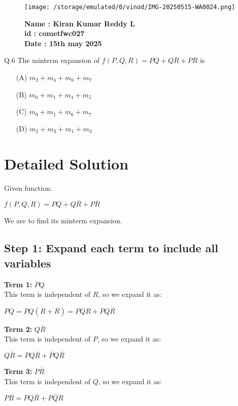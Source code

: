 \documentclass{article}
\begin{document}
\begin{figure}[h!]
    \begin{minipage}{0.45\textwidth}  %
        \texttt{[image: /storage/emulated/0/vinod/IMG-20250515-WA0024.png]}  %
    \end{minipage} \hfill
    \begin{minipage}{0.45\textwidth}  %
        \textbf{Name : Kiran Kumar Reddy L} \\
    \textbf{id : cometfwc027} \\
  \textbf{Date : 15th may 2025}
    \end{minipage}
\end{figure}

\noindent Q.6 \quad The minterm expansion of $f(P, Q, R) = PQ + Q\overline{R} + P\overline{R}$ is
\begin{itemize}
    \item[(A)] $m_2 + m_4 + m_6 + m_7$
    \item[(B)] $m_0 + m_1 + m_4 + m_5$
    \item[(C)] $m_0 + m_1 + m_6 + m_7$
    \item[(D)] $m_2 + m_3 + m_1 + m_3$
\end{itemize}

\section*{Detailed Solution}

Given function:
\begin{center}

$
f(P, Q, R) = PQ + Q\overline{R} + P\overline{R}
$
\end{center}
We are to find its minterm expansion.

\subsection*{Step 1: Expand each term to include all variables}

\textbf{Term 1:} $PQ$ \\
This term is independent of $R$, so we expand it as:
\begin{center}
$
PQ = PQ(R + \overline{R}) = PQR + PQ\overline{R}
$
\end{center}
\textbf{Term 2:} $Q\overline{R}$ \\
This term is independent of $P$, so we expand it as:
\begin{center}
$
Q\overline{R} = PQ\overline{R} + \overline{P}Q\overline{R}
$
\end{center}
\textbf{Term 3:} $P\overline{R}$ \\
This term is independent of $Q$, so we expand it as:
\begin{center}
$
P\overline{R} = PQ\overline{R} + P\overline{Q}\overline{R}
$
\end{center}
\end{document}
